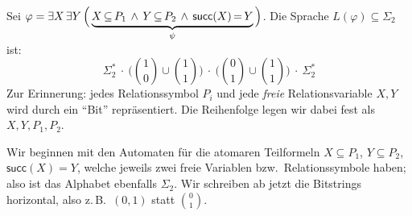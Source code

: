 \documentclass[fontsize=11pt, twoside=false, numbers=autoenddot]{scrbook}
\begin{document}
Sei
$
  \varphi = \exists X\,\exists Y\,\Big(
    \underbrace{%
      X\!\!\:\subseteq\!\!\:P_1 \,\land\, Y\!\!\:\subseteq\!\!\:P_2 \,\land\, \textsf{succ}(X)\!\!\:=\!\!\:Y%
    }_{%
      \psi
    }
  \Big)
$.
Die Sprache $L(\varphi) \subseteq \Sigma_2$ ist:
\[
  \Sigma_2^* ~\cdot~ \Bigg(\binom10 \cup \binom11\Bigg) ~\cdot~ \Bigg(\binom01 \cup \binom11\Bigg) ~\cdot~ \Sigma_2^*
\]
Zur Erinnerung: jedes Relationssymbol $P_i$
und jede \emph{freie} Relationsvariable $X,Y$
wird durch ein "`Bit"' repräsentiert.
Die Reihenfolge legen wir dabei fest als $X,Y,P_1,P_2$.

Wir beginnen mit den Automaten für die atomaren Teilformeln
$X\subseteq P_1$, $Y\subseteq P_2$, $\textsf{succ}(X)=Y$,
welche jeweils zwei freie Variablen bzw.\ Relationssymbole haben; also ist das Alphabet
ebenfalls $\Sigma_2$. Wir schreiben ab jetzt die Bitstrings horizontal,
also z.\,B.\ $(0,1)$ statt $\binom01$.
\end{document}
